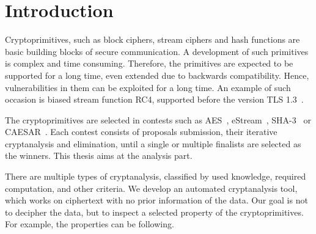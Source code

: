\documentclass[
    digital,    %
    oneside,    %
    color,
    11pt,
    nocover,
    notable,
    nolof,
    nolot,
]{fithesis3}
\begin{document}
\setlength{\parskip}{5pt}
\setlength{\parindent}{0pt}


\chapter{Introduction}
\label{chap:introduction}


Cryptoprimitives, such as block ciphers, stream ciphers and hash functions are basic building blocks of secure communication. A development of such primitives is complex and time consuming. Therefore, the primitives are expected to be supported for a long time, even extended due to backwards compatibility. Hence, vulnerabilities in them can be exploited for a long time. An example of such occasion is biased stream function RC4, supported before the version TLS 1.3~\cite{dierks2008transport}.

The cryptoprimitives are selected in contests such as AES~\cite{aes-competition}, eStream~\cite{estream-competition}, SHA-3~\cite{sha3-competition} or CAESAR~\cite{caesar-competition}. Each contest consists of proposals submission, their iterative cryptanalysis and elimination, until a single or multiple finalists are selected as the winners. This thesis aims at the analysis part.

There are multiple types of cryptanalysis, classified by used knowledge, required computation, and other criteria. We develop an automated cryptanalysis tool, which works on ciphertext with no prior information of the data. Our goal is not to decipher the data, but to inspect a selected property of the cryptoprimitives. For example, the properties can be following.
\end{document}
